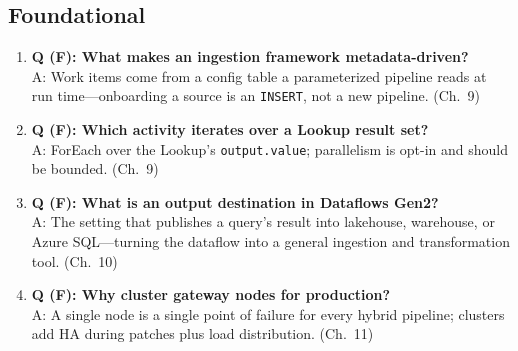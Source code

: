 \subsection*{Foundational}
\begin{enumerate}
    \item \textbf{Q (F): What makes an ingestion framework metadata-driven?}\\
    A: Work items come from a config table a parameterized pipeline reads at run
    time---onboarding a source is an \texttt{INSERT}, not a new pipeline. (Ch.~9)
    \item \textbf{Q (F): Which activity iterates over a Lookup result set?}\\
    A: ForEach over the Lookup's \texttt{output.value}; parallelism is opt-in and should be
    bounded. (Ch.~9)
    \item \textbf{Q (F): What is an output destination in Dataflows Gen2?}\\
    A: The setting that publishes a query's result into lakehouse, warehouse, or Azure
    SQL---turning the dataflow into a general ingestion and transformation tool. (Ch.~10)
    \item \textbf{Q (F): Why cluster gateway nodes for production?}\\
    A: A single node is a single point of failure for every hybrid pipeline; clusters add HA
    during patches plus load distribution. (Ch.~11)
\end{enumerate}

